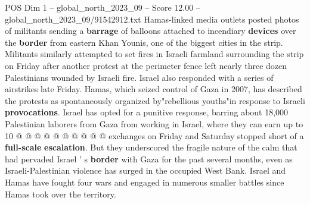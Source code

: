 \begin{textsample}{POS Dim 1 – global\_north\_2023\_09 – Score 12.00 – global\_north\_2023\_09/91542912.txt}
Hamas-linked media outlets posted photos of militants sending a \textbf{barrage} of balloons attached to incendiary \textbf{devices} over the \textbf{border} from eastern Khan Younis, one of the biggest cities in the strip.
Militants similarly attempted to set fires in Israeli farmland surrounding the strip on Friday after another protest at the perimeter fence left nearly three dozen Palestinians wounded by Israeli fire.
Israel also responded with a series of airstrikes late Friday.
Hamas, which seized control of Gaza in 2007, has described the protests as spontaneously organized by"rebellious youths"in response to Israeli \textbf{provocations}.
Israel has opted for a punitive response, barring about 18,000 Palestinian laborers from Gaza from working in Israel, where they can earn up to 10 @ @ @ @ @ @ @ @ @ @ exchanges on Friday and Saturday stopped short of a \textbf{full-scale} \textbf{escalation}.
But they underscored the fragile nature of the calm that had pervaded Israel ' s \textbf{border} with Gaza for the past several months, even as Israeli-Palestinian violence has surged in the occupied West Bank.
Israel and Hamas have fought four wars and engaged in numerous smaller battles since Hamas took over the territory.

\end{textsample}
